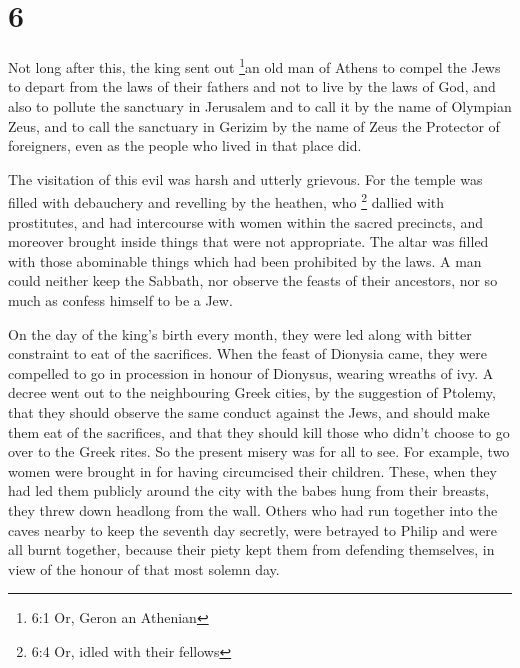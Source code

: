 \hypertarget{section-4}{%
\section{6}\label{section-4}}

 Not long after this, the king sent out \footnote{6:1 Or,
  Geron an Athenian}an old man of Athens to compel the Jews to depart
from the laws of their fathers and not to live by the laws of God,
 and also to pollute the sanctuary in Jerusalem and to call
it by the name of Olympian Zeus, and to call the sanctuary in Gerizim by
the name of Zeus the Protector of foreigners, even as the people who
lived in that place did.

 The visitation of this evil was harsh and utterly grievous.
 For the temple was filled with debauchery and revelling by
the heathen, who \footnote{6:4 Or, idled with their fellows} dallied
with prostitutes, and had intercourse with women within the sacred
precincts, and moreover brought inside things that were not appropriate.
 The altar was filled with those abominable things which had
been prohibited by the laws.  A man could neither keep the
Sabbath, nor observe the feasts of their ancestors, nor so much as
confess himself to be a Jew.

 On the day of the king's birth every month, they were led
along with bitter constraint to eat of the sacrifices. When the feast of
Dionysia came, they were compelled to go in procession in honour of
Dionysus, wearing wreaths of ivy.  A decree went out to the
neighbouring Greek cities, by the suggestion of Ptolemy, that they
should observe the same conduct against the Jews, and should make them
eat of the sacrifices,  and that they should kill those who
didn't choose to go over to the Greek rites. So the present misery was
for all to see.  For example, two women were brought in for
having circumcised their children. These, when they had led them
publicly around the city with the babes hung from their breasts, they
threw down headlong from the wall.  Others who had run
together into the caves nearby to keep the seventh day secretly, were
betrayed to Philip and were all burnt together, because their piety kept
them from defending themselves, in view of the honour of that most
solemn day.

